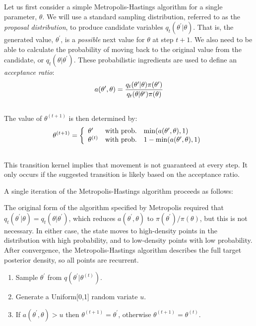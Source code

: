 \documentclass[letterpaper,10pt,english]{sphinxmanual}
\begin{document}
Let us first consider a simple Metropolis-Hastings algorithm for a single
parameter, $\theta$. We will use a standard sampling distribution,
referred to as the \emph{proposal distribution}, to produce candidate variables
$q_t(\theta^{\prime} | \theta)$. That is, the generated value,
$\theta^{\prime}$, is a \emph{possible} next value for $\theta$ at step
$t+1$. We also need to be able to calculate the probability of moving back
to the original value from the candidate, or
$q_t(\theta | \theta^{\prime})$. These probabilistic ingredients are used
to define an \emph{acceptance ratio}:
\begin{gather}
\begin{split}a(\theta^{\prime},\theta) = \frac{q_t(\theta^{\prime} | \theta) \pi(\theta^{\prime})}{q_t(\theta | \theta^{\prime}) \pi(\theta)}\end{split}\notag\\\begin{split}\end{split}\notag
\end{gather}
The value of $\theta^{(t+1)}$ is then determined by:
\begin{gather}
\begin{split}\theta^{(t+1)} = \left\{\begin{array}{l@{\quad \mbox{with prob.} \quad}l}\theta^{\prime} & \min(a(\theta^{\prime},\theta),1) \\ \theta^{(t)} & 1 - \min(a(\theta^{\prime},\theta),1) \end{array}\right.\end{split}\notag\\\begin{split}\end{split}\notag
\end{gather}
This transition kernel implies that movement is not guaranteed at every step. It
only occurs if the suggested transition is likely based on the acceptance ratio.

A single iteration of the Metropolis-Hastings algorithm proceeds as follows:

The original form of the algorithm specified by Metropolis required that
$q_t(\theta^{\prime} | \theta) = q_t(\theta | \theta^{\prime})$, which
reduces $a(\theta^{\prime},\theta)$ to
$\pi(\theta^{\prime})/\pi(\theta)$, but this is not necessary. In either
case, the state moves to high-density points in the distribution with high
probability, and to low-density points with low probability. After convergence,
the Metropolis-Hastings algorithm describes the full target posterior density,
so all points are recurrent.
\begin{enumerate}
\item {} 
Sample $\theta^{\prime}$ from $q(\theta^{\prime} | \theta^{(t)})$.

\item {} 
Generate a Uniform{[}0,1{]} random variate $u$.

\item {} 
If $a(\theta^{\prime},\theta) > u$ then $\theta^{(t+1)} = \theta^{\prime}$, otherwise $\theta^{(t+1)} = \theta^{(t)}$.

\end{enumerate}
\end{document}
